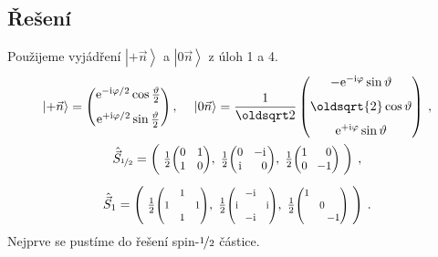 \documentclass[10pt,a4paper]{article}
\def\ph{\phantom}
\def\lzw{\mathllap}
\newcommand*{\mask}[2]{%
    \mathord{\makebox[\widthof{\(#1\)}]{\(#2\)}}%
}
\newcommand{\const}[1]{\text{#1}}
\newcommand{\mat}[1]{
    \begin{pmatrix}
        #1
    \end{pmatrix}
}
\newcommand{\smat}[2][1]{
    \scalebox{#1}{$\mat{#2}$}
}
\newcommand{\ket}[1]{\left| #1 \right>}
\newcommand{\e}[1]{\const{e}^{#1}}
\renewcommand{\i}{\const{i}}
\newcommand{\vechat}[1]{\hat{\vec{#1}}}
\def\1{\mathbbm{1}}
\def\0{\mask{+}{0}}
\begin{document}
\subsection{Řešení}
Použijeme vyjádření $\ket{+\vec n}$ a $\ket{0\vec n}$ z úloh 1 a 4.
\begin{gather*}
    \ket{+ \vec n} =
    \mat{
        \e{-\i \varphi/2} \cos \tfrac{\vartheta}{2}\\[7pt]
        \e{+\i \varphi/2} \sin \tfrac{\vartheta}{2}
    }
    , \: \quad
    \ket{0\vec n}
    =
    \frac{1}{\oldsqrt 2}
    \mat{
        -\e{-\i \varphi} \sin \vartheta \\[7pt]
        \oldsqrt{2} \cos \vartheta \\[7pt]
        \e{+\i \varphi} \sin \vartheta
    }
    \: ,
    \\
    \vechat S_{\nicefrac{1}{2}} = \left( \;
        \tfrac{1}{2} \smat[0.9]{0&1\\1&0}, \;
        \tfrac{1}{2} \smat[0.9]{0&\!-\i\\\i&\ph{\!-}0}, \;
        \tfrac{1}{2} \smat[0.9]{1&\ph{\!-}0\\0&\!-1} \;
    \right)
    \: ,
    \\[5pt]
    \vechat S_1 = \left( \;
        \tfrac{1}{2} \smat[0.8]{&1&\\1&&1\\&1}, \;
        \tfrac{1}{2} \smat[0.8]{&\!\!-\i&\\\i&&\i\\&\!\!-\i}, \;
        \tfrac{1}{2} \smat[0.8]{1&&\\&0&\\&&\lzw{-}1} \;
    \right)
    \: .
\end{gather*}
Nejprve se pustíme do řešení spin-$\nicefrac{1}{2}$ částice.
\end{document}
